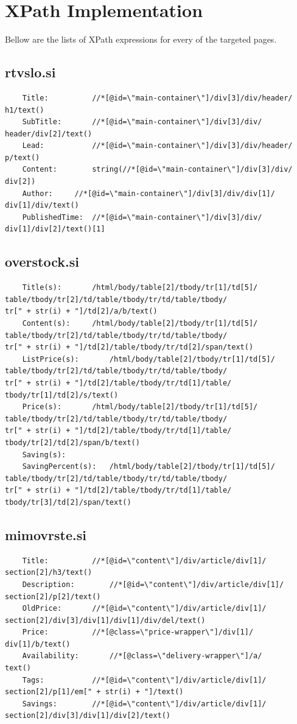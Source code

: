 \documentclass[9pt]{IEEEtran}
\begin{document}
\section{XPath Implementation}

Bellow are the lists of XPath expressions for every of the targeted pages.


\subsection{rtvslo.si}
\begin{verbatim}
	Title:			//*[@id=\"main-container\"]/div[3]/div/header/
h1/text()
	SubTitle:		//*[@id=\"main-container\"]/div[3]/div/
header/div[2]/text()
	Lead:			//*[@id=\"main-container\"]/div[3]/div/header/
p/text()
	Content:		string(//*[@id=\"main-container\"]/div[3]/div/
div[2])
	Author:		//*[@id=\"main-container\"]/div[3]/div/div[1]/
div[1]/div/text()
	PublishedTime:	//*[@id=\"main-container\"]/div[3]/div/
div[1]/div[2]/text()[1]
\end{verbatim}

\subsection{overstock.si}
\begin{verbatim}
	Title(s): 		/html/body/table[2]/tbody/tr[1]/td[5]/
table/tbody/tr[2]/td/table/tbody/tr/td/table/tbody/
tr[" + str(i) + "]/td[2]/a/b/text()
	Content(s):		/html/body/table[2]/tbody/tr[1]/td[5]/
table/tbody/tr[2]/td/table/tbody/tr/td/table/tbody/
tr[" + str(i) + "]/td[2]/table/tbody/tr/td[2]/span/text()
	ListPrice(s):		/html/body/table[2]/tbody/tr[1]/td[5]/
table/tbody/tr[2]/td/table/tbody/tr/td/table/tbody/
tr[" + str(i) + "]/td[2]/table/tbody/tr/td[1]/table/
tbody/tr[1]/td[2]/s/text()
	Price(s):		/html/body/table[2]/tbody/tr[1]/td[5]/
table/tbody/tr[2]/td/table/tbody/tr/td/table/tbody/
tr[" + str(i) + "]/td[2]/table/tbody/tr/td[1]/table/
tbody/tr[2]/td[2]/span/b/text()
	Saving(s):			
	SavingPercent(s):	/html/body/table[2]/tbody/tr[1]/td[5]/
table/tbody/tr[2]/td/table/tbody/tr/td/table/tbody/
tr[" + str(i) + "]/td[2]/table/tbody/tr/td[1]/table/
tbody/tr[3]/td[2]/span/text()
\end{verbatim}

\subsection{mimovrste.si}
\begin{verbatim}
	Title:			//*[@id=\"content\"]/div/article/div[1]/
section[2]/h3/text()
	Description:		//*[@id=\"content\"]/div/article/div[1]/
section[2]/p[2]/text()
	OldPrice:		//*[@id=\"content\"]/div/article/div[1]/
section[2]/div[3]/div[1]/div[1]/div/del/text()
	Price:			//*[@class=\"price-wrapper\"]/div[1]/
div[1]/b/text()
	Availability:		//*[@class=\"delivery-wrapper\"]/a/
text()
	Tags:			//*[@id=\"content\"]/div/article/div[1]/
section[2]/p[1]/em[" + str(i) + "]/text()
	Savings:		//*[@id=\"content\"]/div/article/div[1]/
section[2]/div[3]/div[1]/div[2]/text()
\end{verbatim}
\end{document}
